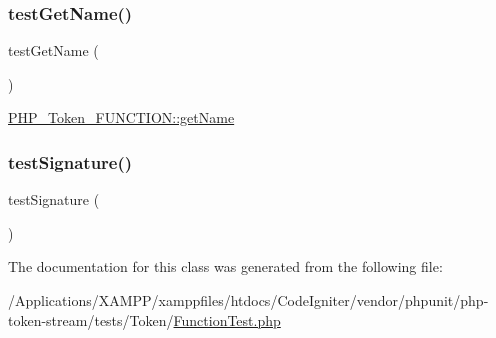 \subsubsection{\texorpdfstring{test\+Get\+Name()}{testGetName()}}
{\footnotesize\ttfamily test\+Get\+Name (\begin{DoxyParamCaption}{ }\end{DoxyParamCaption})}

\mbox{\hyperlink{class_p_h_p___token___f_u_n_c_t_i_o_n_a3d0963e68bb313b163a73f2803c64600}{P\+H\+P\+\_\+\+Token\+\_\+\+F\+U\+N\+C\+T\+I\+O\+N\+::get\+Name}} \mbox{\label{class_p_h_p___token___function_test_a9f6011d072e71f3a7137341a637c13a6}} 
\subsubsection{\texorpdfstring{test\+Signature()}{testSignature()}}
{\footnotesize\ttfamily test\+Signature (\begin{DoxyParamCaption}{ }\end{DoxyParamCaption})}



The documentation for this class was generated from the following file\+:\begin{DoxyCompactItemize}
\item 
/\+Applications/\+X\+A\+M\+P\+P/xamppfiles/htdocs/\+Code\+Igniter/vendor/phpunit/php-\/token-\/stream/tests/\+Token/\mbox{\hyperlink{_function_test_8php}{Function\+Test.\+php}}\end{DoxyCompactItemize}
